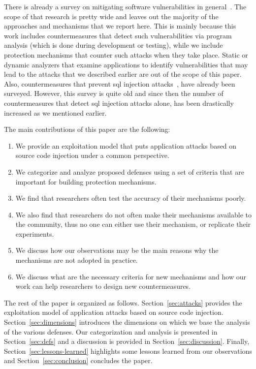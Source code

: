 \documentclass[conference]{IEEEtran}
\begin{document}
There is already a survey on mitigating software vulnerabilities
in general~\cite{SZ12}. The scope of that
research is pretty wide and leaves out the majority of the
approaches and mechanisms that we report here.
This is mainly because this work includes countermeasures
that detect such vulnerabilities via program analysis
(which is done during development or testing), while
we include protection mechanisms that counter
such attacks when they take place. Static or
dynamic analyzers that examine applications to
identify vulnerabilities that may lead to the attacks
that we described earlier are out of the scope of this paper.
Also, countermeasures that prevent {\sc sql}
injection attacks~\cite{HVO06}, have already been surveyed.
However, this survey is quite old and since then
the number of countermeasures that detect {\sc sql}
injection attacks alone, has been drastically increased
as we mentioned earlier.

The main contributions of this paper are the following:

\begin{enumerate}
\item We provide an exploitation model that puts application attacks
  based on source code injection under a common
  perspective.
\item We categorize and analyze proposed defenses using a set of
  criteria that are important for building protection mechanisms.
\item We find that researchers often test the accuracy
  of their mechanisms poorly. 
\item We also find that researchers do not often make their mechanisms
  available to the community, thus no one can either use their
  mechanism, or replicate their experiments.
\item We discuss how our observations may be the main reasons why the
  mechanisms are not adopted in practice.
\item We discuss what are the necessary criteria for new mechanisms
  and how our work can help researchers to design new countermeasures.
\end{enumerate}

The rest of the paper is organized as follows.
Section~\ref{sec:attacks} provides the exploitation model
of application attacks based on source code injection.
Section~\ref{sec:dimensions} introduces the dimensions
on which we base the analysis of the various defenses.
Our categorization and analysis is presented in
Section~\ref{sec:defs} and a discussion is provided in
Section~\ref{sec:discussion}. Finally,
Section~\ref{sec:lessons-learned} highlights
some lessons learned from our observations
and Section~\ref{sec:conclusion} concludes the paper.
\end{document}
